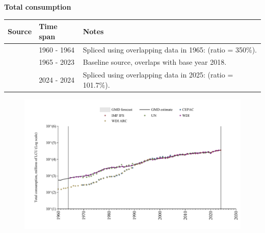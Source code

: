 \documentclass[12pt,a4paper,landscape]{article}
\begin{document}
\begin{adjustbox}{max totalsize={\paperwidth}{\paperheight},center}
\begin{minipage}[t][\textheight][t]{\textwidth}
\vspace*{0.5cm}
{}
\begin{center}
{\Large\bfseries Total consumption}
\end{center}
\vspace{0.5cm}
\begin{table}[H]
\centering
\small
\begin{tabular}{|l|l|l|}
\hline
\textbf{Source} & \textbf{Time span} & \textbf{Notes} \\
\hline
\rowcolor{white}\cite{WDI_ARC}& 1960 - 1964 &Spliced using overlapping data in 1965: (ratio = 350\%). \\
\rowcolor{lightgray}\cite{WDI}& 1965 - 2023 &Baseline source, overlaps with base year 2018. \\
\rowcolor{white}\cite{IMF_IFS}& 2024 - 2024 &Spliced using overlapping data in 2025: (ratio = 101.7\%). \\
\hline
\end{tabular}
\end{table}
\begin{figure}[H]
\centering
\includegraphics[width=\textwidth,height=0.6\textheight,keepaspectratio]{graphs/SLV_cons.pdf}
\end{figure}
\end{minipage}
\end{adjustbox}
\end{document}
